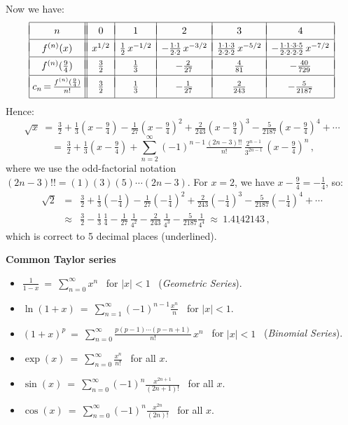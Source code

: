 \documentclass[11pt]{article}
\newcommand{\ds}{\displaystyle}
\begin{document}
Now we have:
$$\begin{array}{|c||c|c|c|c|c|}
\hline &&&&& \\[-.9em] 
n & 0 & 1 & 2  & 3 & 4 
\\[.2em] \hline &&&&& \\[-.9em]
f^{(n)}(x) & x^{1/2} & \frac12\,x^{-1/2} 
&-\frac{1\cdot 1}{2\cdot 2}\,x^{-3/2} 
& \frac{1\cdot 1\cdot 3}{2\cdot 2\cdot 2}\,x^{-5/2} 
& -\frac{1\cdot 1\cdot 3\cdot 5}{2\cdot 2\cdot 2\cdot 2}\,x^{-7/2} 
\\[.2em] \hline &&&&& \\[-.9em] 
f^{(n)}(\frac94) & \frac{3}{2} & \frac{1}{3} & -\frac{2}{27} & \frac{4}{81} & -\frac{40}{729}
\\[.3em] \hline &&&&&\\[-1em] 
\!c_n\,{=}\,\frac{f^{(n)}(\frac94)}{n!}\! & \frac32 &\frac13 & -\frac1{27} & \frac2{243} & -\frac5{2187}  
\\[.5em] \hline
\end{array}$$
Hence:
$$
\sqrt{x} \ =\ 
\tfrac32 + \tfrac13(x{-}\tfrac94)
-\tfrac1{27}(x{-}\tfrac94)^2 + \tfrac{2}{243}(x{-}\tfrac94)^3
- \tfrac{5}{2187}(x{-}\tfrac94)^4+\cdots
$$
$$
\ =\ \tfrac 32 + \tfrac13(x{-}\tfrac94)+ \sum_{n=2}^\infty (-1)^{n-1}\tfrac{(2n-3)!!}{n!}\,\tfrac{2^{n-1}}{3^{2n-1}}\,(x{-}\tfrac94)^n\,,
$$
where we use the odd-factorial notation $(2n{-}3)!! = (1)(3)(5)\cdots
(2n{-}3)$.
For $x=2$, we have $x{-}\tfrac94 = -\frac14$, so:
$$\begin{array}{rcl}
\sqrt 2 &=& \tfrac32 + \tfrac13(-\tfrac14)
-\tfrac1{27}(-\tfrac14)^2 + \tfrac{2}{243}(-\tfrac14)^3
- \tfrac{5}{2187}(-\tfrac14)^4+\cdots
\\[.5em]
&\approx& 
\tfrac32 - \tfrac13\,\tfrac14
-\tfrac1{27}\,\tfrac1{4^2} - \tfrac{2}{243}\,\tfrac1{4^3}
- \tfrac{5}{2187}\tfrac1{4^4}
\ \approx\ \underline{1.41421}43\,,
\end{array}$$
which is correct to 5 decimal places (underlined).
\newpage

\noindent
{\bf Common Taylor series}
\begin{itemize}


\item $\ds\frac{1}{1{-}x} \ =\ \sum_{n=0}^\infty x^n$ \ for $|x|<1$ \ ({\it Geometric Series}).

\item $\ds\ln(1{+}x) \ =\ 
\sum_{n=1}^\infty (-1)^{n-1} \frac{x^n}{n}$ \ for $|x|<1$.

\item $(1{+}x)^p \ =\  \ds\sum_{n=0}^\infty
\frac{p(p{-}1)\cdots (p{-}n{+}1)}{n!}\, x^n$ \  for $|x|<1$
\ ({\it Binomial Series}).

 \item $\ds\exp(x)\ =\ \sum_{n=0}^\infty \frac{x^n}{n!}$ \ for all $x$.  

\item $\ds\sin(x)\ =\ \sum_{n=0}^\infty (-1)^n\frac{x^{2n+1}}{(2n{+}1)!}$ \ for all $x$.

\item $\ds\cos(x)\ =\ \sum_{n=0}^\infty (-1)^n\frac{x^{2n}}{(2n)!}$ \ for all $x$.

\end{itemize}
\vspace{1em}
\end{document}
